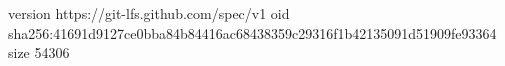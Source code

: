 version https://git-lfs.github.com/spec/v1
oid sha256:41691d9127ce0bba84b84416ac68438359c29316f1b42135091d51909fe93364
size 54306
